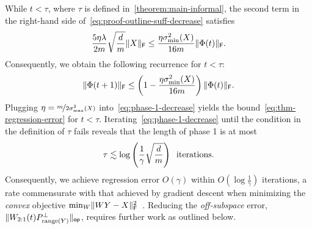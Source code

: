 While $t < \tau$, where $\tau$ is defined in~\cref{theorem:main-informal}, the second
term in the right-hand side of~\eqref{eq:proof-outline-suff-decrease} satisfies
\[
	\frac{5 \eta \lambda}{2 m} \sqrt{\frac{d}{m}} \lVert X\rVert_{\mathsf{F}} \leq
	\frac{\eta \sigma_{\min}^2(X)}{16 m} \lVert\Phi(t)\rVert_{\mathsf{F}}.
\]
Consequently, we obtain the following recurrence for $t < \tau$:
\begin{equation}
	\lVert\Phi(t+1)\rVert_{\mathsf{F}} \leq \left(1 - \frac{\eta \sigma_{\min}^2(X)}{16 m}\right) \lVert\Phi(t)\rVert_{\mathsf{F}}.
	\label{eq:phase-1-decrease}
\end{equation}
Plugging $\eta = \nicefrac{m}{2 \sigma_{\max}^2(X)}$ into~\eqref{eq:phase-1-decrease} yields the bound~\eqref{eq:thm-regression-error} for $t < \tau$.
Iterating~\eqref{eq:phase-1-decrease} until the condition in the definition of $\tau$ fails reveals that the length of
phase 1 is at most
\begin{equation}
	\tau \lesssim \log\left(\frac{1}{\gamma} \sqrt{\frac{d}{m}}\right) \;\;
	\text{iterations.}
	\label{eq:proof-sketch-tau-bound}
\end{equation}
Consequently, we achieve regression error $O(\gamma)$ within $O(\log \frac{1}{\gamma})$ iterations, a rate
commensurate with that achieved by gradient descent when minimizing the \emph{convex} objective
$\min_{W} \lVert WY - X\rVert_{\mathsf{F}}^2$~\cite{du2019width}. Reducing the \emph{off-subspace} error,
$\lVert W_{2:1}(t) P_{\mathrm{range}(Y)}^{\perp}\rVert_{\mathsf{op}}$,
requires further work as outlined below.
\vspace*{-1em}

